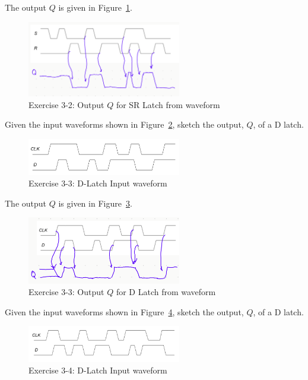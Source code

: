 \documentclass[12pt]{article}
\newenvironment{ex}[2][Exercise]{\begin{trivlist}
		\item[\hskip \labelsep {\bfseries #1}\hskip \labelsep {\bfseries #2.}]}{\end{trivlist}}
\newenvironment{sol}[1][Solution]{\begin{trivlist}
		\item[\hskip \labelsep {\bfseries #1:}]}{\end{trivlist}}
\begin{document}
\begin{sol}
	The output $Q$ is given in Figure~\ref{03-02-sr-latch-output}.
	\begin{figure}[h]
		\centering
		\includegraphics[width=0.6\textwidth]{03-02-sr-latch-output}
		\caption{Exercise 3-2: Output $Q$ for SR Latch from waveform}
		\label{03-02-sr-latch-output}
	\end{figure}
\end{sol}

\begin{ex}{3-3}
	Given the input waveforms shown in Figure~\ref{03-03-input-waveform}, sketch the output, $Q$, of a D latch.
	\begin{figure}[h]
		\centering
		\includegraphics[width=0.6\textwidth]{03-03-input-waveform}
		\caption{Exercise 3-3: D-Latch Input waveform}
		\label{03-03-input-waveform}
	\end{figure}
\end{ex}

\begin{sol}
	The output $Q$ is given in Figure~\ref{03-03-D-latch-output}.
	\begin{figure}[h]
		\centering
		\includegraphics[width=0.6\textwidth]{03-03-D-latch-output}
		\caption{Exercise 3-3: Output $Q$ for D Latch from waveform}
		\label{03-03-D-latch-output}
	\end{figure}
\end{sol}

\begin{ex}{3-4}
	Given the input waveforms shown in Figure~\ref{03-04-input-waveform}, sketch the output, $Q$, of a D latch.
	\begin{figure}[h]
		\centering
		\includegraphics[width=0.6\textwidth]{03-04-input-waveform}
		\caption{Exercise 3-4: D-Latch Input waveform}
		\label{03-04-input-waveform}
	\end{figure}
\end{ex}
\end{document}
